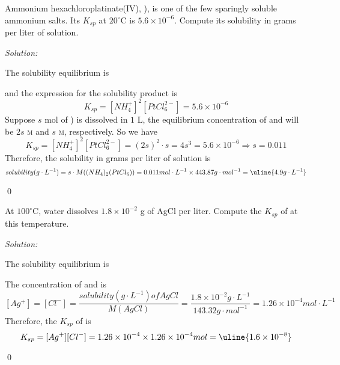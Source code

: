\documentclass[12pt]{article}
\newenvironment{problem}[2][Problem]{\begin{trivlist}
\item[\hskip \labelsep {\bfseries #1}\hskip \labelsep {\bfseries #2.}]}{\end{trivlist}}
\newenvironment{sol}
    {\emph{Solution:}
    }
    {
    \qed
    }
\begin{document}
\begin{problem}{16.10}
Ammonium hexachloroplatinate(IV), ), is one of the few sparingly soluble ammonium salts. Its $K_{sp}$ at $20^{\circ}$C is $5.6\times10^{-6}$. Compute its solubility in grams per liter of solution.
\end{problem}
\begin{sol}
The solubility equilibrium is
\begin{center}
\end{center}
and the expression for the solubility product is
\[
K_{sp}=[NH_4^+]^2[PtCl_6^{2-}]=5.6\times10^{-6}
\]
Suppose $s$ mol of ) is dissolved in $1$ L, the equilibrium concentration of  and  will be $2s$ \textsc{m} and $s$ \textsc{m}, respectively. So we have
\[
K_{sp}=[NH_4^+]^2[PtCl_6^{2-}]=(2s)^2\cdot s=4s^3=5.6\times10^{-6}\Longrightarrow s=0.011
\]
Therefore, the solubility in grams per liter of  solution is
\[
solubility (g\cdot L^{-1})=s\cdot M((NH_4)_2(PtCl_6))=0.011mol\cdot L^{-1}\times443.87g\cdot mol^{-1}=\uline{4.9g\cdot L^{-1}}
\]
\end{sol}

\begin{problem}{16.15}
At $100 ^{\circ}$C, water dissolves $1.8\times10^{-2}$ g of AgCl per liter. Compute the $K_{sp}$ of  at this temperature.
\end{problem}
\begin{sol}
The solubility equilibrium is
\begin{center}
\end{center}
The concentration of  and  is
\[
[Ag^+]=[Cl^-]=\frac{solubility (g\cdot L^{-1}) of AgCl}{M(AgCl)}=\frac{1.8\times10^{-2}g\cdot L^{-1}}{143.32g\cdot mol^{-1}}=1.26\times10^{-4}mol\cdot L^{-1}
\]
Therefore, the $K_{sp}$ of  is
\[
K_{sp}=[Ag^+][Cl^-]=1.26\times10^{-4}\times1.26\times10^{-4}mol=\uline{1.6\times10^{-8}}
\]
\end{sol}
\end{document}

